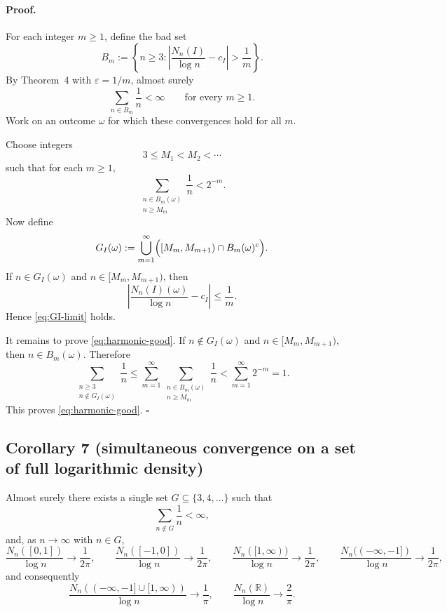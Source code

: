 \paragraph{Proof.}
For each integer $m\ge1$, define the bad set
\[
B_m:=\left\{n\ge3:\left|\frac{N_n(I)}{\log n}-c_I\right|>\frac1m\right\}.
\]
By Theorem~4 with $\varepsilon=1/m$, almost surely
\[
\sum_{n\in B_m}\frac1n<\infty
\qquad\text{for every }m\ge1.
\]
Work on an outcome $\omega$ for which these convergences hold for all $m$.

Choose integers
\[
3\le M_1<M_2<\cdots
\]
such that for each $m\ge1$,
\[
\sum_{\substack{n\in B_m(\omega)\\ n\ge M_m}}\frac1n<2^{-m}.
\]
Now define
\[
G_I(\omega):=
\bigcup_{m=1}^{\infty}
\Bigl([M_m,M_{m+1})\cap B_m(\omega)^c\Bigr).
\]
If $n\in G_I(\omega)$ and $n\in[M_m,M_{m+1})$, then
\[
\left|\frac{N_n(I)(\omega)}{\log n}-c_I\right|\le \frac1m.
\]
Hence \eqref{eq:GI-limit} holds.

It remains to prove \eqref{eq:harmonic-good}. If $n\notin G_I(\omega)$ and $n\in[M_m,M_{m+1})$, then $n\in B_m(\omega)$. Therefore
\[
\sum_{\substack{n\ge3\\ n\notin G_I(\omega)}}\frac1n
\le
\sum_{m=1}^{\infty}
\sum_{\substack{n\in B_m(\omega)\\ n\ge M_m}}\frac1n
<\sum_{m=1}^{\infty}2^{-m}=1.
\]
This proves \eqref{eq:harmonic-good}.
\hfill$\square$

\subsection*{Corollary 7 (simultaneous convergence on a set of full logarithmic density)}
Almost surely there exists a single set $G\subseteq\{3,4,\dots\}$ such that
\[
\sum_{n\notin G}\frac1n<\infty,
\]
and, as $n\to\infty$ with $n\in G$,
\[
\frac{N_n([0,1])}{\log n}\to\frac{1}{2\pi},
\qquad
\frac{N_n([-1,0])}{\log n}\to\frac{1}{2\pi},
\qquad
\frac{N_n([1,\infty))}{\log n}\to\frac{1}{2\pi},
\qquad
\frac{N_n((-\infty,-1])}{\log n}\to\frac{1}{2\pi},
\]
and consequently
\[
\frac{N_n((-\infty,-1]\cup[1,\infty))}{\log n}\to\frac{1}{\pi},
\qquad
\frac{N_n(\mathbb R)}{\log n}\to\frac{2}{\pi}.
\]

